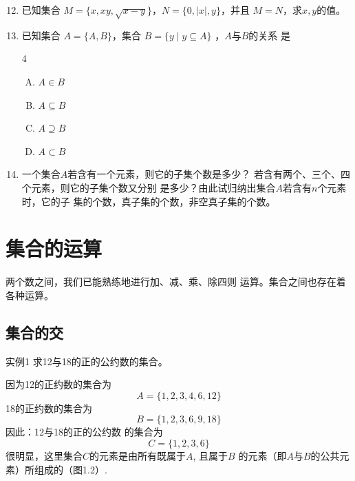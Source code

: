 \begin{enumerate}
    \setcounter{enumi}{11}
    \item 已知集合
    $M=\{x,    xy,\sqrt{x-y}\}$，$N=\{0,|x|,y\}$，并且
    $M=N$，求$x,y$的值。
    \item 已知集合
    $A=\{A,B\}$，集合
    $B=\{y\mid y\subseteq A\}$
    ，$A$与$B$的关系
    是
\begin{multicols}{4}
    \begin{enumerate}[(A)]
        \item $A\in B$
        \item $A\subseteq B$
        \item $A\supseteq B$
        \item $A\subset B$
    \end{enumerate}
\end{multicols}

    \item 一个集合$A$若含有一个元素，则它的子集个数是多少？
    若含有两个、三个、四个元素，则它的子集个数又分别
    是多少？由此试归纳出集合$A$若含有$n$个元素时，它的子
    集的个数，真子集的个数，非空真子集的个数。
\end{enumerate}

\section{集合的运算}
两个数之间，我们已能熟练地进行加、减、乘、除四则
运算。集合之间也存在着各种运算。
\subsection{集合的交}

\begin{thm}{实例1}
    求12与18的正的公约数的集合。
\end{thm}

因为12的正约数的集合为
\[A=\{1,2,3,4,6,12\}\]
18的正约数的集合为
\[B=\{1,2,3,6,9,18\}\]
因此：12与18的正的公约数
的集合为
\[C=\{1,2,3,6\}\]
很明显，这里集合$C$的元素是由所有既属于$A$, 且属于$B$
的元素（即$A$与$B$的公共元素）所组成的（图1.2）.

\begin{figure}[htp]
    \centering
{}
    \caption{}
\end{figure}




